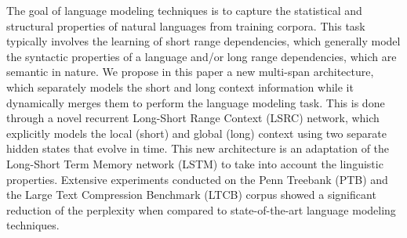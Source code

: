 The goal of language modeling techniques is to capture the statistical and structural properties of natural languages from training corpora. This task typically involves the learning of short range dependencies, which generally model the syntactic properties of a language and/or long range dependencies, which are semantic in nature. We propose in this paper a new multi-span architecture, which separately models the short and long context information while it dynamically merges them to perform the language modeling task. This is done through a novel recurrent Long-Short Range Context (LSRC) network, which explicitly models the local (short) and global (long) context using two separate hidden states that evolve in time. This new architecture is an adaptation of the Long-Short Term Memory network (LSTM) to take into account the linguistic properties. Extensive experiments conducted on the Penn Treebank (PTB) and the Large Text Compression Benchmark (LTCB) corpus showed a significant reduction of the perplexity when compared to state-of-the-art language modeling techniques.
